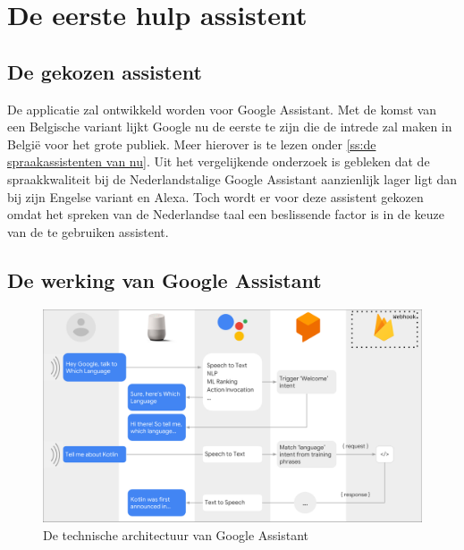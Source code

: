 
\chapter{De eerste hulp assistent}
\label{ch:De eerste hulp assistent}

\section{De gekozen assistent}
De applicatie zal ontwikkeld worden voor Google Assistant. Met de komst van een Belgische variant lijkt Google nu de eerste te zijn die de intrede zal maken in België voor het grote publiek. Meer hierover is te lezen onder \ref{ss:de spraakassistenten van nu}.
Uit het vergelijkende onderzoek is gebleken dat de spraakkwaliteit bij de Nederlandstalige Google Assistant aanzienlijk lager ligt dan bij zijn Engelse variant en Alexa. Toch wordt er voor deze assistent gekozen omdat het spreken van de Nederlandse taal een beslissende factor is in de keuze van de te gebruiken assistent.

\section{De werking van Google Assistant}
\begin{figure}[h]
    \includegraphics[width=0.7\linewidth]{img/gaflow}
    \caption{De technische architectuur van Google Assistant \autocite{Brandt2018}}
    \label{fig:gaflow}
\end{figure}

